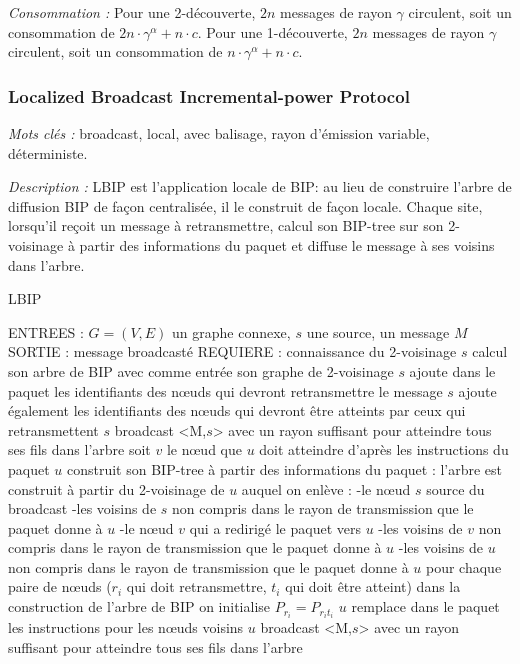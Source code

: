 \emph{Consommation :} Pour une 2-découverte, $2n$ messages de rayon $\gamma$ circulent, soit un consommation de $2n\cdot \gamma^\alpha +  n\cdot c$.
Pour une 1-découverte, $2n$ messages de rayon $\gamma$ circulent, soit un consommation de $n\cdot \gamma^\alpha +  n\cdot c$.



\subsubsection{Localized Broadcast Incremental-power Protocol \cite{Ingelrest2004}}
\emph{Mots clés :} broadcast, local, avec balisage, rayon d'émission variable, déterministe.

\emph{Description :} LBIP est l'application locale de BIP: au lieu de construire l'arbre de diffusion BIP de façon centralisée, il le construit de façon locale.
Chaque site, lorsqu'il reçoit un message à retransmettre, calcul son BIP-tree sur son 2-voisinage à partir des informations du paquet et diffuse le message à ses voisins dans l'arbre.


\begin{algorithm}[H]
\caption{LBIP}
\label{algo_LBIP}
\begin{algorithmic}
\STATE ENTREES : $G=(V,E)$ un graphe connexe, $s$ une source, un message $M$
\STATE SORTIE : message broadcasté
\STATE REQUIERE : connaissance du 2-voisinage
\STATE $s$ calcul son arbre de BIP avec comme entrée son graphe de 2-voisinage
\STATE $s$ ajoute dans le paquet les identifiants des nœuds qui devront retransmettre le message
\STATE $s$ ajoute également les identifiants des nœuds qui devront être atteints par ceux qui retransmettent
\STATE $s$ broadcast <M,$s$> avec un rayon suffisant pour atteindre tous ses fils dans l'arbre
		\STATE soit $v$ le nœud que $u$ doit atteindre d'après les instructions du paquet
		\STATE $u$ construit son BIP-tree à partir des informations du paquet :
			 \INDSTATE l'arbre est construit à partir du 2-voisinage de $u$ auquel on enlève :
			 	 \INDSTATE[2]-le nœud $s$ source du broadcast
				 \INDSTATE[2]-les voisins de $s$ non compris dans le rayon de transmission que le paquet donne à $u$
				 \INDSTATE[2]-le nœud $v$ qui a redirigé le paquet vers $u$
				 \INDSTATE[2]-les voisins de $v$ non compris dans le rayon de transmission que le paquet donne à $u$
				 \INDSTATE[2]-les voisins de $u$ non compris dans le rayon de transmission que le paquet donne à $u$
			\INDSTATE[1] pour chaque paire de nœuds ($r_i$ qui doit retransmettre, $t_i$ qui doit être atteint)
				\INDSTATE[2] dans la construction de l'arbre de BIP on initialise $P_{r_i} = P_{r_i t_i}$
			\INDSTATE[1] $u$ remplace dans le paquet les instructions pour les nœuds voisins
			\INDSTATE[1] $u$ broadcast <M,$s$> avec un rayon suffisant pour atteindre tous ses fils dans l'arbre
	\ENDIF
\ENDIF
\end{algorithmic}
\end{algorithm}

